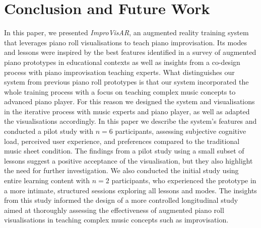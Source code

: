 \documentclass{vgtc}                          %
\begin{document}
\section{Conclusion and Future Work}
\par In this paper, we presented \textit{ImproVisAR}, an augmented reality training system that leverages piano roll visualisations to teach piano improvisation. Its modes and lessons were inspired by the best features identified in a survey of augmented piano prototypes in educational contexts
as well as insights from a co-design process with piano improvisation teaching experts.
What distinguishes our system from previous piano roll prototypes is that our system incorporated the whole training process with a focus on teaching complex music concepts to advanced piano player. For this reason we designed the system and visualisations in the iterative process with music experts and piano player, as well as adapted the visualisations accordingly. 
In this paper we describe the system’s features and conducted a pilot study with $n=6$ participants, assessing subjective cognitive load, perceived user experience, and preferences compared to the traditional music sheet condition. The findings from a pilot study using a small subset of lessons suggest a positive acceptance of the visualisation, but they also highlight the need for further investigation. We also conducted the initial study using entire learning content with $n=2$ participants, who experienced the prototype in a more intimate, structured sessions exploring all lessons and modes. The insights from this study informed the design of a more controlled longitudinal study aimed at thoroughly assessing the effectiveness of augmented piano roll visualisations in teaching complex music concepts such as improvisation. %


\end{document}

